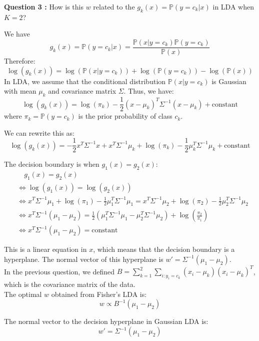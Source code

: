 \documentclass[12pt,a4paper]{article}
\begin{document}
\color{black}

\noindent\textbf{Question 3 :}
How is this $w$ related to the $g_k(x) = \mathbb{P}(y = c_k | x)$ in LDA when $K = 2$? \\

\color{blue}

We have
\[
g_k(x) = \mathbb{P}(y = c_k | x) = \frac{\mathbb{P}(x | y = c_k) \mathbb{P}(y = c_k)}{\mathbb{P}(x)}
\]
Therefore:
\[
\log(g_k(x)) = \log(\mathbb{P}(x | y = c_k)) + \log(\mathbb{P}(y = c_k)) - \log(\mathbb{P}(x))
\]
In LDA, we assume that the conditional distribution $\mathbb{P}(x | y = c_k)$ is Gaussian with mean $\mu_k$ and covariance matrix $\Sigma$. Thus, we have:
\[
\log(g_k(x)) = \log(\pi_k) -\frac{1}{2} (x - \mu_k)^T \Sigma^{-1} (x - \mu_k) + \text{constant}
\]
where $\pi_k = \mathbb{P}(y = c_k)$ is the prior probability of class $c_k$.

\newpage
We can rewrite this as:
\[
\log(g_k(x)) = -\frac{1}{2} x^T \Sigma^{-1} x + x^T \Sigma^{-1} \mu_k + \log(\pi_k) - \frac{1}{2} \mu_k^T \Sigma^{-1} \mu_k + \text{constant}
\]

The decision boundary is when $g_1(x) = g_2(x)$:
\begin{align*}
    &\quad g_1(x) = g_2(x) \\
    &\Leftrightarrow \log(g_1(x)) = \log(g_2(x)) \\
    &\Leftrightarrow x^T \Sigma^{-1} \mu_1 + \log(\pi_1) - \frac{1}{2} \mu_1^T \Sigma^{-1} \mu_1 = x^T \Sigma^{-1} \mu_2 + \log(\pi_2) - \frac{1}{2} \mu_2^T \Sigma^{-1} \mu_2 \\
    &\Leftrightarrow x^T \Sigma^{-1} (\mu_1 - \mu_2) = \frac{1}{2} (\mu_1^T \Sigma^{-1} \mu_1 - \mu_2^T \Sigma^{-1} \mu_2) + \log(\frac{\pi_2}{\pi_1}) \\
    &\Leftrightarrow x^T \Sigma^{-1} (\mu_1 - \mu_2) = \text{constant}
\end{align*}

This is a linear equation in $x$, which means that the decision boundary is a hyperplane.
The normal vector of this hyperplane is $w' = \Sigma^{-1} (\mu_1 - \mu_2)$. \\

In the previous question, we defined $B = \sum_{k=1}^2 \sum_{i:y_i=c_k} (x_i - \mu_k)(x_i - \mu_k)^T$, which is the covariance matrix of the data. \\

The optimal $w$ obtained from Fisher's LDA is:
\[
w \propto B^{-1} (\mu_1 - \mu_2)
\]

The normal vector to the decision hyperplane in Gaussian LDA is:
\[
w' = \Sigma^{-1} (\mu_1 - \mu_2)
\]
\end{document}
